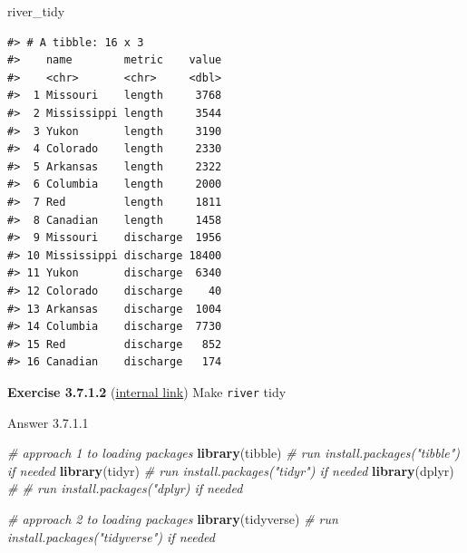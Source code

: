 \documentclass[
]{book}
\newenvironment{Shaded}{\begin{snugshade}}{\end{snugshade}}
\newcommand{\CommentTok}[1]{\textcolor[rgb]{0.56,0.35,0.01}{\textit{#1}}}
\newcommand{\DataTypeTok}[1]{\textcolor[rgb]{0.13,0.29,0.53}{#1}}
\newcommand{\KeywordTok}[1]{\textcolor[rgb]{0.13,0.29,0.53}{\textbf{#1}}}
\newcommand{\NormalTok}[1]{#1}
\newcommand{\OperatorTok}[1]{\textcolor[rgb]{0.81,0.36,0.00}{\textbf{#1}}}
\newcommand{\StringTok}[1]{\textcolor[rgb]{0.31,0.60,0.02}{#1}}
\begin{document}
\begin{Shaded}
\begin{Highlighting}[]
\NormalTok{river_tidy}
\end{Highlighting}
\end{Shaded}

\begin{verbatim}
#> # A tibble: 16 x 3
#>    name        metric    value
#>    <chr>       <chr>     <dbl>
#>  1 Missouri    length     3768
#>  2 Mississippi length     3544
#>  3 Yukon       length     3190
#>  4 Colorado    length     2330
#>  5 Arkansas    length     2322
#>  6 Columbia    length     2000
#>  7 Red         length     1811
#>  8 Canadian    length     1458
#>  9 Missouri    discharge  1956
#> 10 Mississippi discharge 18400
#> 11 Yukon       discharge  6340
#> 12 Colorado    discharge    40
#> 13 Arkansas    discharge  1004
#> 14 Columbia    discharge  7730
#> 15 Red         discharge   852
#> 16 Canadian    discharge   174
\end{verbatim}

\textbf{Exercise 3.7.1.2} (\protect\hyperlink{ex-set14}{internal link})
Make \texttt{river} tidy

Answer 3.7.1.1

\begin{Shaded}
\begin{Highlighting}[]
\CommentTok{# approach 1 to loading packages}
\KeywordTok{library}\NormalTok{(tibble) }\CommentTok{# run install.packages("tibble") if needed}
\KeywordTok{library}\NormalTok{(tidyr) }\CommentTok{# run install.packages("tidyr") if needed}
\KeywordTok{library}\NormalTok{(dplyr) }\CommentTok{# # run install.packages("dplyr) if needed}
\end{Highlighting}
\end{Shaded}

\begin{Shaded}
\begin{Highlighting}[]
\CommentTok{# approach 2 to loading packages}
\KeywordTok{library}\NormalTok{(tidyverse) }\CommentTok{# run install.packages("tidyverse") if needed}
\end{Highlighting}
\end{Shaded}

\begin{Shaded}
\end{Shaded}
\end{document}
